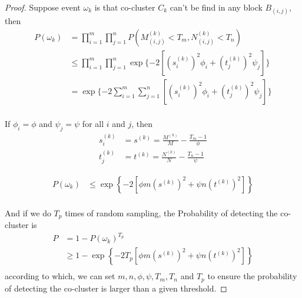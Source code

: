 \begin{proof}
    Suppose event $\omega_k$ is that co-cluster $C_k$ can't be find in any block $B_{(i,j)}$, then
    \begin{equation}
        \begin{split}
            P(\omega_k) & = \prod_{i=1}^m \prod_{j=1}^n P(M_{(i,j)}^{(k)} < T_m, N_{(i,j)}^{(k)} < T_n)                          \\
                        & \le \prod_{i=1}^m \prod_{j=1}^n \exp\{-2 \left[ (s_i^{(k)})^2 \phi_i + (t_j^{(k)})^2 \psi_j \right] \} \\
                        & = \exp\{-2 \sum_{i=1}^m \sum_{j=1}^n \left[ (s_i^{(k)})^2 \phi_i + (t_j^{(k)})^2 \psi_j \right] \}     \\
        \end{split}
    \end{equation}

    If $\phi_i = \phi$ and $\psi_j = \psi$ for all $i$ and $j$, then
    \begin{equation}
        \begin{split}
            s_i^{(k)} & = s^{(k)} = \frac{M^{(k)}}{M}-\frac{T_m-1}{\phi} \\
            t_j^{(k)} & = t^{(k)} = \frac{N^{(k)}}{N}-\frac{T_n-1}{\psi}
        \end{split}
    \end{equation}

    \begin{equation}
        \begin{split}
            P(\omega_k) & \le \exp \left\{ -2 [\phi m (s^{(k)})^2 + \psi n (t^{(k)})^2] \right\} \\
        \end{split}
    \end{equation}


    And if we do $T_p$ times of random sampling, the Probability of detecting the co-cluster is
    \begin{equation}
        \begin{split}
            P & = 1 - P(\omega_k)^{T_p}                                                        \\
              & \ge 1 - \exp \left\{ -2 T_p [\phi m (s^{(k)})^2 + \psi n (t^{(k)})^2] \right\} \\
        \end{split}
    \end{equation}
    according to which, we can set $m, n, \phi, \psi, T_m, T_n$ and $T_p$ to ensure the probability of detecting the co-cluster is larger than a given threshold.
\end{proof}